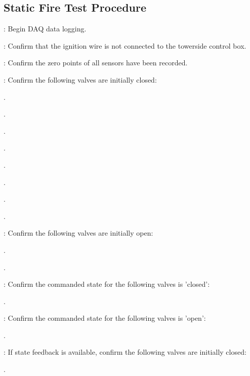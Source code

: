 \subsection{Static Fire Test Procedure}
\begin{checklist}
    \item \daq{}: Begin DAQ data logging. 
    \item \secondary{}: Confirm that the ignition wire is not connected to the towerside control box.
    \item \daq{}: Confirm the zero points of all sensors have been recorded. 
    \item \primary{}: Confirm the following valves are initially closed:
    \begin{checklist}
        \item \oxfill{}. 
        \item \moxfill{}.
        \item \oxdrain{}.
        \item \moxdrain{}.
        \item \purge{}. 
        \item \pdrain{}.
        \item \ohshit{}.
        \item \fdrain{}.
    \end{checklist}
    \item \primary{}: Confirm the following valves are initially open:
    \begin{checklist}
        \item \fiso{}.
        \item \oxiso{}.
    \end{checklist}
    \item \rlcs{}: Confirm the commanded state for the following valves is 'closed':
    \begin{checklist}
        \item \inj{}.
    \end{checklist}
    \item \rlcs{}: Confirm the commanded state for the following valves is 'open':
    \begin{checklist}
        \item \vent{}. 
    \end{checklist}
    \item \daq{}: If state feedback is available, confirm the following valves are initially closed:
    \begin{checklist}
        \item \finj{}. 

\end{checklist}
\end{checklist}
